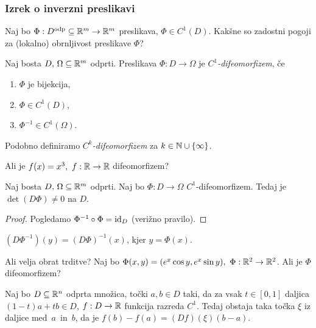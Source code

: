 \subsubsection{Izrek o inverzni preslikavi}
Naj bo $\Phi: D^\text{odp} \subseteq \mathbb{R}^m \to \mathbb{R}^m$ preslikava, $\Phi \in C^1(D)$. Kakšne so zadostni pogoji za (lokalno) obrnljivost preslikave $\Phi$?
\begin{definicija}
    Naj bosta $D, \, \Omega \subseteq \mathbb{R}^m$ odprti. Preslikava $\Phi: D  \to \Omega$ je \emph{$C^1$-difeomorfizem}, če
    \begin{enumerate}
        \item $\Phi$ je bijekcija, 
        \item $\Phi \in C^1(D)$,
        \item $\Phi^{-1} \in C^1(\Omega)$.
    \end{enumerate} 
    Podobno definiramo \emph{$C^k$-difeomorfizem} za $k \in \mathbb{N} \cup \left\{\infty\right\}$.
\end{definicija}

\begin{zgled}
    Ali je $f(x) = x^3, \ f: \mathbb{R} \to \mathbb{R}$ difeomorfizem?
\end{zgled}

\begin{trditev}
    Naj bosta $D, \, \Omega \subseteq \mathbb{R}^m$ odprti. Naj bo $\Phi: D  \to \Omega$ $C^1$-difeomorfizem. Tedaj je $\det(D\Phi) \neq 0$ na $D$. 
\end{trditev}

\begin{proof}
    Pogledamo $\Phi^{-1} \circ \Phi = \operatorname{id}_D$ (verižno pravilo).
\end{proof}

\begin{posledica}
    $(D\Phi^{-1})(y) = (D\Phi)^{-1}(x)$, kjer $y = \Phi(x)$.
\end{posledica}

\begin{zgled}
    Ali velja obrat trditve? 
    Naj bo $\Phi(x,y) = (e^x \cos y, e^x \sin y), \ \Phi: \mathbb{R}^2 \to \mathbb{R}^2$. Ali je $\Phi$ difeomorfizem?
\end{zgled}

\begin{lema}
    Naj bo $D \subseteq \mathbb{R}^n$ odprta množica, točki $a, b \in D$ taki, da za vsak $t \in [0,1]$ daljica $(1-t)a + tb \in D$, $f: D \to \mathbb{R}$ funkcija razreda $C^1$.     
    Tedaj obstaja taka točka $\xi$ iz daljice med~$a$~in~$b$, da je $f(b)-f(a) = (Df)(\xi)(b-a)$.
\end{lema}

